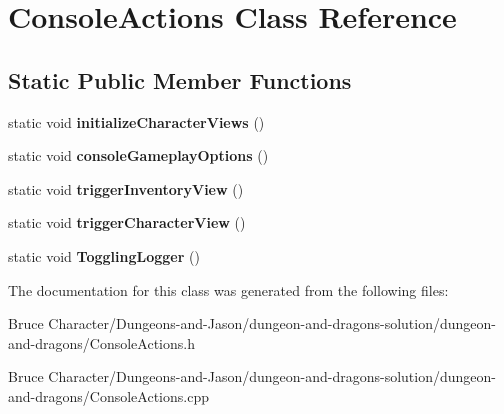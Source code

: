 \hypertarget{class_console_actions}{}\section{Console\+Actions Class Reference}
\label{class_console_actions}
\subsection*{Static Public Member Functions}
\begin{DoxyCompactItemize}
\item 
\hypertarget{class_console_actions_ad5c92b346d09d7e591af55bd64c6d456}{}\label{class_console_actions_ad5c92b346d09d7e591af55bd64c6d456} 
static void {\bfseries initialize\+Character\+Views} ()
\item 
\hypertarget{class_console_actions_a9f595711253a7fca8e5306057f2b56fa}{}\label{class_console_actions_a9f595711253a7fca8e5306057f2b56fa} 
static void {\bfseries console\+Gameplay\+Options} ()
\item 
\hypertarget{class_console_actions_a944ebf98865726dd3198b1cad3e4055e}{}\label{class_console_actions_a944ebf98865726dd3198b1cad3e4055e} 
static void {\bfseries trigger\+Inventory\+View} ()
\item 
\hypertarget{class_console_actions_a773a98c7908d8160ed751ab2ede8127b}{}\label{class_console_actions_a773a98c7908d8160ed751ab2ede8127b} 
static void {\bfseries trigger\+Character\+View} ()
\item 
\hypertarget{class_console_actions_a737c74ed0cf23d2df963008917cf0631}{}\label{class_console_actions_a737c74ed0cf23d2df963008917cf0631} 
static void {\bfseries Toggling\+Logger} ()
\end{DoxyCompactItemize}


The documentation for this class was generated from the following files\+:\begin{DoxyCompactItemize}
\item 
Bruce Character/\+Dungeons-\/and-\/\+Jason/dungeon-\/and-\/dragons-\/solution/dungeon-\/and-\/dragons/Console\+Actions.\+h\item 
Bruce Character/\+Dungeons-\/and-\/\+Jason/dungeon-\/and-\/dragons-\/solution/dungeon-\/and-\/dragons/Console\+Actions.\+cpp\end{DoxyCompactItemize}
